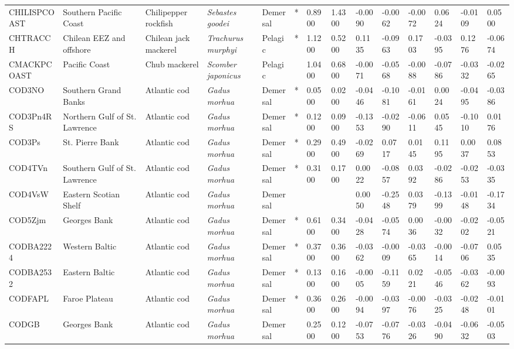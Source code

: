 \begin{longtable}{p{2.8cm}p{2cm}p{1.7cm}p{1.7cm}p{1cm}p{0.3cm}p{1cm}p{1cm}p{1cm}p{1cm}p{1cm}p{1cm}p{1cm}p{1cm}}
  CHILISPCOAST & Southern Pacific Coast & Chilipepper rockfish & \textit{Sebastes goodei} & Demersal & * & 0.8900 & 1.4300 & -0.0090 & -0.0062 & -0.0072 & 0.0624 & -0.0109 & 0.0500 \\ 
  CHTRACCH & Chilean EEZ and offshore & Chilean jack mackerel & \textit{Trachurus murphyi} & Pelagic & * & 1.1200 & 0.5200 & 0.1135 & -0.0963 & 0.1703 & -0.0395 & 0.1276 & -0.0674 \\ 
  CMACKPCOAST & Pacific Coast & Chub mackerel & \textit{Scomber japonicus} & Pelagic &   & 1.0400 & 0.6800 & -0.0071 & -0.0568 & -0.0088 & -0.0786 & -0.0332 & -0.0265 \\ 
  COD3NO & Southern Grand Banks & Atlantic cod & \textit{Gadus morhua} & Demersal & * & 0.0500 & 0.0200 & -0.0446 & -0.1081 & -0.0161 & 0.0024 & -0.0495 & -0.0386 \\ 
  COD3Pn4RS & Northern Gulf of St. Lawrence & Atlantic cod & \textit{Gadus morhua} & Demersal & * & 0.1200 & 0.0900 & -0.1353 & -0.0290 & -0.0611 & 0.0545 & -0.1010 & 0.0176 \\ 
  COD3Ps & St. Pierre Bank & Atlantic cod & \textit{Gadus morhua} & Demersal & * & 0.2900 & 0.4900 & -0.0269 & 0.0717 & 0.0145 & 0.1195 & 0.0037 & 0.0853 \\ 
  COD4TVn & Southern Gulf of St. Lawrence & Atlantic cod & \textit{Gadus morhua} & Demersal & * & 0.3100 & 0.1700 & 0.0022 & -0.0857 & 0.0392 & -0.0286 & -0.0253 & -0.0335 \\ 
  COD4VsW & Eastern Scotian Shelf & Atlantic cod & \textit{Gadus morhua} & Demersal &  &  &  & 0.0050 & -0.2548 & 0.0379 & -0.1399 & -0.0148 & -0.1734 \\ 
  COD5Zjm & Georges Bank & Atlantic cod & \textit{Gadus morhua} & Demersal & * & 0.6100 & 0.3400 & -0.0428 & -0.0574 & 0.0036 & -0.0032 & -0.0202 & -0.0521 \\ 
  CODBA2224 & Western Baltic & Atlantic cod & \textit{Gadus morhua} & Demersal & * & 0.3700 & 0.3600 & -0.0362 & -0.0009 & -0.0365 & -0.0014 & -0.0706 & 0.0535 \\ 
  CODBA2532 & Eastern Baltic & Atlantic cod & \textit{Gadus morhua} & Demersal & * & 0.1300 & 0.1600 & -0.0005 & -0.1159 & 0.0221 & -0.0546 & -0.0362 & -0.0093 \\ 
  CODFAPL & Faroe Plateau & Atlantic cod & \textit{Gadus morhua} & Demersal & * & 0.3600 & 0.2600 & -0.0094 & -0.0397 & -0.0076 & -0.0325 & -0.0248 & -0.0101 \\ 
  CODGB & Georges Bank & Atlantic cod & \textit{Gadus morhua} & Demersal &   & 0.2500 & 0.1200 & -0.0753 & -0.0776 & -0.0326 & -0.0490 & -0.0632 & -0.0503 \\ 

\end{longtable}
